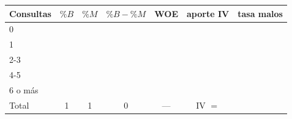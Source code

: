 \documentclass[11pt]{article}
\begin{document}
\begin{center}
\renewcommand{\arraystretch}{1.6}
\begin{tabular}{l|c|c|c|c|c|c}\toprule
Consultas & $\%B$ & $\%M$ & $\%B-\%M$ & WOE & aporte IV & tasa malos\\\midrule
0 & & & & & & \\
1 & & & & & & \\
2-3 & & & & & & \\
4-5 & & & & & & \\
6 o más & & & & & & \\\midrule
Total & 1 & 1 & 0 & --- & IV $=$ & \\\bottomrule
\end{tabular}
\end{center}
\end{document}
